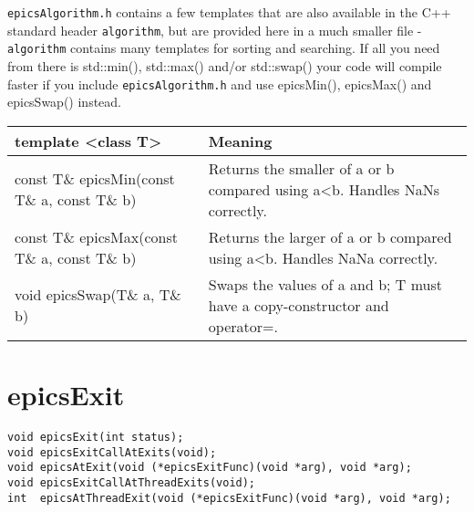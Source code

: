\verb|epicsAlgorithm.h| contains a few templates that are also available in the C++ standard header \verb|algorithm|, but are 
provided here in a much smaller file - \verb|algorithm| contains many templates for sorting and searching.  If all you need 
from there is std::min(), std::max() and/or std::swap() your code will compile faster if you include \verb|epicsAlgorithm.h| 
and use epicsMin(), epicsMax() and epicsSwap() instead.
\begin{center}
\begin{longtable}{p{2.5in}p{4.25in}}
\textbf{template \textless{}class T\textgreater{}} & \textbf{Meaning}\\
\hline
const T\& epicsMin(const T\& a, const T\& b) & Returns the smaller of a or b compared using a\textless{}b. Handles NaNs correctly.\\
const T\& epicsMax(const T\& a, const T\& b) & Returns the larger of a or b compared using a\textless{}b. Handles NaNa correctly.\\
void epicsSwap(T\& a, T\& b) & Swaps the values of a and b; T must have a copy-constructor and operator=.
\end{longtable}

\end{center}


\section{epicsExit}

\begin{verbatim}
void epicsExit(int status);
void epicsExitCallAtExits(void);
void epicsAtExit(void (*epicsExitFunc)(void *arg), void *arg);
void epicsExitCallAtThreadExits(void);
int  epicsAtThreadExit(void (*epicsExitFunc)(void *arg), void *arg);
\end{verbatim}

